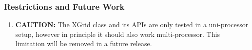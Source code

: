 
\subsubsection{Restrictions and Future Work}

\begin{enumerate}
\label{XGrid:rest}

\item {\bf CAUTION:} The XGrid class and its APIs are only tested in a 
uni-processor setup, however in principle it should also work multi-processor. 
This limitation will be removed in a future release.

\end{enumerate}



